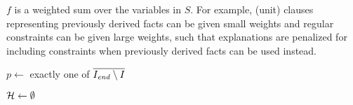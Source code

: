 %
$f$ is a weighted sum over the variables in $S$. For example, (unit) clauses representing previously derived facts can be given small weights and regular constraints can be given large weights, such that explanations are penalized for including constraints when previously derived facts can be used instead. %



\newcommand\onestepo{\ensuremath{\call{explain-One-Step-ocus}}\xspace}
\begin{algorithm}[t]
  \DontPrintSemicolon
  
  \caption{$\onestepo(\formulac,f,I,\Iend)$}
  \label{alg:oneStepOCUS}
  $p \leftarrow$ exactly one of $\overline{I_\mathit{end} \setminus I}$\;
\end{algorithm}
\begin{algorithm}[t]
  \DontPrintSemicolon
  $\mathcal{H}  \gets \emptyset$ \; %
  \caption{$\comus(\formula,f,p)$ }
  \label{alg:comus}
\end{algorithm}


